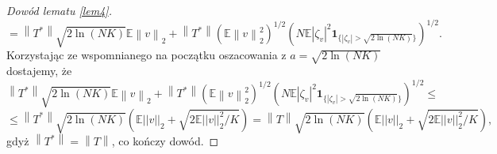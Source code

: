 \documentclass{mwart}
\newcommand{\norm}[1]{\left\lVert#1\right\rVert}
\begin{document}
\begin{proof}[Dowód lematu \ref{lem4}]
\begin{displaymath}
=\norm{T^*}\sqrt{2\ln (NK)}\mathbb{E}\norm{v}_2+\norm{T^*}\left(\mathbb{E}\norm{v}_2^2\right)^{1/2}\left(N\mathbb{E}|\zeta_v|^2\pmb{1}_{\{|\zeta_v|> \sqrt{2\ln (NK)}\}}\right)^{1/2}.
\end{displaymath}
Korzystając ze wspomnianego na początku oszacowania z $a=\sqrt{2\ln (NK)}$ dostajemy, że
\begin{displaymath}
\norm{T^*}\sqrt{2\ln (NK)}\mathbb{E}\norm{v}_2+\norm{T^*}\left(\mathbb{E}\norm{v}_2^2\right)^{1/2}\left(N\mathbb{E}|\zeta_v|^2\pmb{1}_{\{|\zeta_v|> \sqrt{2\ln (NK)}\}}\right)^{1/2}\leq
\end{displaymath}
\begin{displaymath}
\leq \norm{T^*}\sqrt{2\ln (NK)}\left(\mathbb{E}||v||_2+\sqrt{2\mathbb{E}||v||_2^2/K}\right)=\norm{T}\sqrt{2\ln (NK)}\left(\mathbb{E}||v||_2+\sqrt{2\mathbb{E}||v||_2^2/K}\right),
\end{displaymath}
 gdyż $\norm{T^*}=\norm{T}$, co kończy dowód.
\end{proof}
\end{document}
